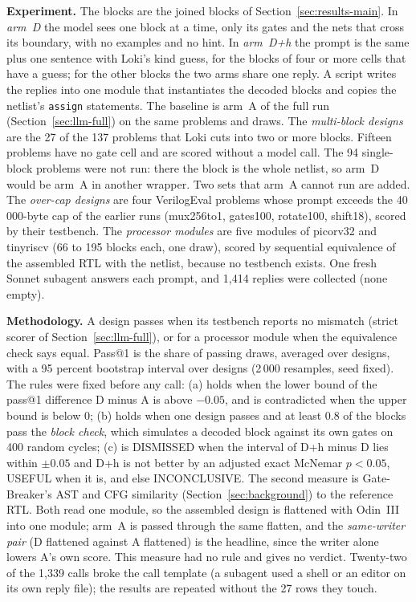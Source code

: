 \documentclass[conference]{IEEEtran}
\newcommand{\hev}[1]{\par\smallskip\noindent\textbf{#1}}
\newcommand{\code}[1]{\texttt{#1}}
\begin{document}
\hev{Experiment.} The blocks are the joined blocks of Section~\ref{sec:results-main}. In \emph{arm~D} the model sees one block at a time, only its gates and the nets that cross its boundary, with no examples and no hint. In \emph{arm~D+h} the prompt is the same plus one sentence with Loki's kind guess, for the blocks of four or more cells that have a guess; for the other blocks the two arms share one reply. A script writes the replies into one module that instantiates the decoded blocks and copies the netlist's \code{assign} statements. The baseline is arm~A of the full run (Section~\ref{sec:llm-full}) on the same problems and draws. The \emph{multi-block designs} are the 27 of the 137 problems that Loki cuts into two or more blocks. Fifteen problems have no gate cell and are scored without a model call. The 94 single-block problems were not run: there the block is the whole netlist, so arm~D would be arm~A in another wrapper. Two sets that arm~A cannot run are added. The \emph{over-cap designs} are four VerilogEval problems whose prompt exceeds the 40\,000-byte cap of the earlier runs (mux256to1, gates100, rotate100, shift18), scored by their testbench. The \emph{processor modules} are five modules of picorv32 and tinyriscv (66 to 195 blocks each, one draw), scored by sequential equivalence of the assembled RTL with the netlist, because no testbench exists. One fresh Sonnet subagent answers each prompt, and 1,414 replies were collected (none empty).

\hev{Methodology.} A design passes when its testbench reports no mismatch (strict scorer of Section~\ref{sec:llm-full}), or for a processor module when the equivalence check says equal. Pass@1 is the share of passing draws, averaged over designs, with a 95 percent bootstrap interval over designs (2\,000 resamples, seed fixed). The rules were fixed before any call: (a) holds when the lower bound of the pass@1 difference D minus A is above $-0.05$, and is contradicted when the upper bound is below 0; (b) holds when one design passes and at least 0.8 of the blocks pass the \emph{block check}, which simulates a decoded block against its own gates on 400 random cycles; (c) is DISMISSED when the interval of D+h minus D lies within $\pm0.05$ and D+h is not better by an adjusted exact McNemar $p<0.05$, USEFUL when it is, and else INCONCLUSIVE. The second measure is Gate-Breaker's AST and CFG similarity (Section~\ref{sec:background}) to the reference RTL. Both read one module, so the assembled design is flattened with Odin~III into one module; arm~A is passed through the same flatten, and the \emph{same-writer pair} (D flattened against A flattened) is the headline, since the writer alone lowers A's own score. This measure had no rule and gives no verdict. Twenty-two of the 1,339 calls broke the call template (a subagent used a shell or an editor on its own reply file); the results are repeated without the 27 rows they touch.
\end{document}
